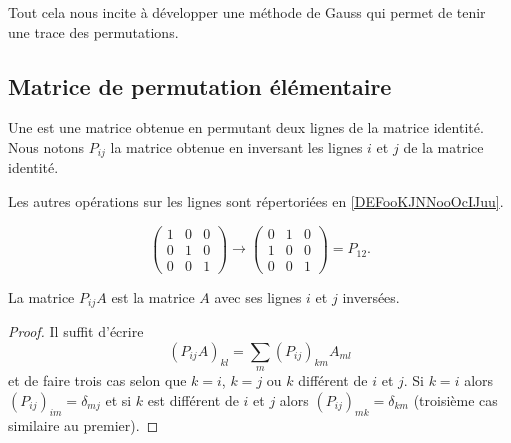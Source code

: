 Tout cela nous incite à développer une méthode de Gauss qui permet de tenir une trace des permutations.

\subsection{Matrice de permutation élémentaire}

\begin{definition}
	Une  est une matrice obtenue en permutant deux lignes de la matrice identité. Nous notons \( P_{ij}\) la matrice obtenue en inversant les lignes \( i\) et \( j\) de la matrice identité.
\end{definition}

Les autres opérations sur les lignes sont répertoriées en \ref{DEFooKJNNooOcIJuu}.

\begin{example}
	\begin{equation}
		\begin{pmatrix}
			1 & 0 & 0 \\
			0 & 1 & 0 \\
			0 & 0 & 1
		\end{pmatrix}\to
		\begin{pmatrix}
			0 & 1 & 0 \\
			1 & 0 & 0 \\
			0 & 0 & 1
		\end{pmatrix}=P_{12}.
	\end{equation}
\end{example}

\begin{lemma}
	La matrice \( P_{ij}A\) est la matrice \( A\) avec ses lignes \( i\) et \( j\) inversées.
\end{lemma}

\begin{proof}
	Il suffit d'écrire
	\begin{equation}
		(P_{ij}A)_{kl}=\sum_m(P_{ij})_{km}A_{ml}
	\end{equation}
	et de faire trois cas selon que \( k=i\), \( k=j\) ou \( k\) différent de \( i\) et \( j\). Si \( k=i\) alors \( (P_{ij})_{im}=\delta_{mj}\) et si \( k\) est différent de \( i\) et \( j\) alors \( (P_{ij})_{mk}=\delta_{km}\) (troisième cas similaire au premier).
\end{proof}

